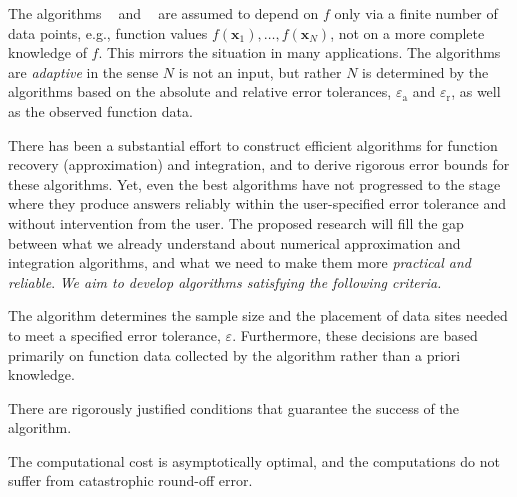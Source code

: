 \documentclass[11pt]{NSFamsart}
\DeclareMathOperator{\APP}{APP}
\DeclareMathOperator{\INT}{INT}
\DeclareMathOperator{\hAPP}{\widehat{\APP}}
\DeclareMathOperator{\hINT}{\widehat{\INT}}
\newcommand{\bx}{{\boldsymbol{x}}}
\newcommand{\abstol}{\varepsilon_{\text{a}}}
\newcommand{\reltol}{\varepsilon_{\text{r}}}
\begin{document}
The algorithms $\hAPP$ and $\hINT$ are assumed to depend on $f$ only via a finite number of data points, e.g., function values $f(\bx_1), \ldots, f(\bx_N)$, not on a more complete knowledge of $f$.  This mirrors the situation in many applications.  The algorithms are \emph{adaptive} in the sense $N$ is not an input, but rather $N$ is determined by the algorithms based on the absolute and relative error tolerances, $\abstol$ and $\reltol$, as well as the observed function data.







\vspace{2cm}{\huge \bf Everything below here is the old proposal}\vspace{2cm}

There has been a substantial effort to construct efficient algorithms for function recovery (approximation) and integration, and to derive rigorous error bounds for these algorithms.  Yet, even the best algorithms have not progressed to the stage where they produce answers reliably within the user-specified error tolerance and without intervention from the user.  The proposed research will fill the gap between what we already understand about numerical approximation and integration algorithms, and what we  need to make them more \emph{practical and reliable}.  \emph{We aim to develop algorithms satisfying the following criteria.}

\begin{description}[leftmargin=2.5ex]
\item[Automatic \& Adaptive] The algorithm determines the sample size and the placement of data sites needed to meet a specified error tolerance, $\varepsilon$. Furthermore, these decisions are based primarily on function data collected by the algorithm rather than a priori knowledge.

\item[Guaranteed] There are rigorously justified conditions that guarantee the success of the algorithm.

\item[Efficient \& Stable] The computational cost is asymptotically optimal, and the computations do not suffer from catastrophic round-off error.
\end{description}
\end{document}
